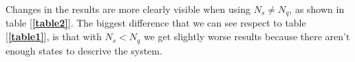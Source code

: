\documentclass[12pt]{article}
\begin{document}
Changes in the results are more clearly visible when using $N_{s} \neq N_{q}$, as shown in table [{\textbf{\ref{table2}}}]. The biggest difference that we can see respect to table [{\textbf{\ref{table1}}}], is that with $N_{s} < N_{q}$ we get slightly worse results because there aren't enough states to descrive the system.

\begin{table}[H]\tiny
\end{table}
\end{document}
